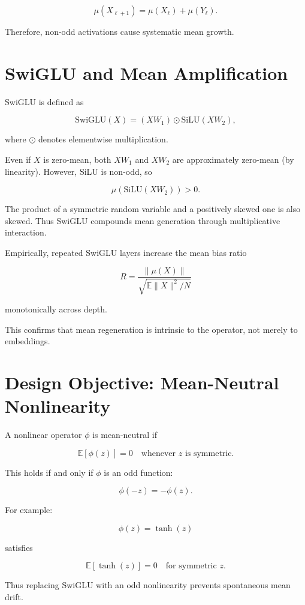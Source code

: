 \[
\mu(X_{\ell+1}) = \mu(X_\ell) + \mu(Y_\ell).
\]

Therefore, non-odd activations cause systematic mean growth.

\section{SwiGLU and Mean Amplification}

SwiGLU is defined as

\begin{equation}
\text{SwiGLU}(X)
=
(X W_1) \odot \text{SiLU}(X W_2),
\end{equation}

where $\odot$ denotes elementwise multiplication.

Even if $X$ is zero-mean,
both $XW_1$ and $XW_2$ are approximately zero-mean (by linearity).
However, SiLU is non-odd, so

\[
\mu(\text{SiLU}(XW_2)) > 0.
\]

The product of a symmetric random variable and a positively skewed one
is also skewed.
Thus SwiGLU compounds mean generation through multiplicative interaction.

Empirically, repeated SwiGLU layers increase
the mean bias ratio

\[
R = \frac{\|\mu(X)\|}{\sqrt{\mathbb{E}\|X\|^2 / N}}
\]

monotonically across depth.

This confirms that mean regeneration is intrinsic to the operator,
not merely to embeddings.

\section{Design Objective: Mean-Neutral Nonlinearity}

A nonlinear operator $\phi$ is mean-neutral if

\[
\mathbb{E}[\phi(z)] = 0
\quad \text{whenever } z \text{ is symmetric}.
\]

This holds if and only if $\phi$ is an odd function:

\[
\phi(-z) = -\phi(z).
\]

For example:

\[
\phi(z) = \tanh(z)
\]

satisfies

\[
\mathbb{E}[\tanh(z)] = 0
\quad \text{for symmetric } z.
\]

Thus replacing SwiGLU with an odd nonlinearity
prevents spontaneous mean drift.

